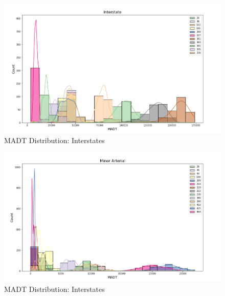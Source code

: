 \documentclass[9pt,twocolumn,twoside, lineno]{jost-new}
\numberwithin{subsection}{section}
\begin{document}
\begin{figure}
\centering
    \includegraphics[width=14.4cm]{figures/hist_interstate.png}
\caption{MADT Distribution: Interstates}
\label{fig:hist_interstate}
\end{figure}
\begin{figure}
\centering
    \includegraphics[width=14.4cm]{figures/hist_minor_arterial.png}
\caption{MADT Distribution: Interstates}
\label{fig:hist_minor_arterial}
\end{figure}
\end{document}
